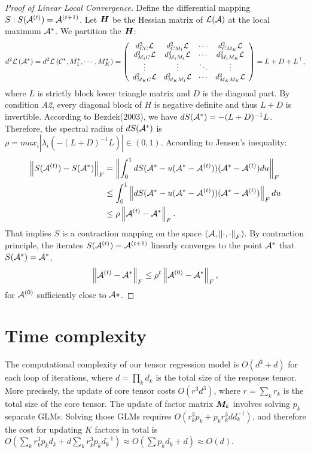 \documentclass[11pt]{article}
\theoremstyle{plain}
\theoremstyle{definition}
\begin{document}
\begin{proof}[Proof of Linear Local Convergence]
Define the differential mapping $S: S(\mathcal{A}^{(t)}) = \mathcal{A}^{(t + 1)}$. Let $\bm{H}$ be the Hessian matrix of $\mathcal{L}(\mathcal{A})$ at the local maximum $\mathcal{A}^*$. We partition the $\bm{H}$:
\begin{align*}
    d^{2} \mathcal{L}\left(\mathcal{A}^* \right) =  d^{2} \mathcal{L}\left(\mathcal{C}^*, M_1^*,\cdots,M_K^* \right) =\left(\begin{array}{cccc}d_{CC}^{2} \mathcal{L} &d_{CM_1}^{2} \mathcal{L}  & \cdots & d_{CM_K}^{2} \mathcal{L} \\ d_{M_1C}^{2} \mathcal{L}  &d_{M_1 M_1}^{2} \mathcal{L} & \cdots &  d_{M_1 M_K}^{2} \mathcal{L}\\ \vdots & \vdots & \ddots & \vdots \\d_{M_KC}^{2} \mathcal{L}& d_{M_K M_1}^{2} \mathcal{L} & \cdots & d_{M_K M_K}^{2} \mathcal{L} \end{array}\right)=L+D+L^{\top},
\end{align*}
where $L$ is strictly block lower triangle matrix and $D$ is the diagonal part. By condition \textit{A2}, every diagonal block of $H$ is negative definite and thus $L+ D$ is invertible.  According to Bezdek(2003), we have $d S(\mathcal{A}^*) = -(L+D)^{-1} L$.  Therefore, the spectral radius of $dS(\mathcal{A}^*)$ is $\rho =  max_i |\lambda_i(-(L+D)^{-1} L)| \in (0,1)$. According to Jensen's inequality:
\begin{align*}
    \left\lVert S(\mathcal{A}^{(t)})- S(\mathcal{A}^*)\right\rVert_F &= \left\lVert \int_{0}^1 dS( \mathcal{A}^{*} - u (\mathcal{A}^* - \mathcal{A}^{(t)})) (\mathcal{A}^* - \mathcal{A}^{(t)}) du\right\rVert_F \\
    &\leq \int_{0}^1 \left\lVert dS( \mathcal{A}^{*} - u (\mathcal{A}^* - \mathcal{A}^{(t)})) (\mathcal{A}^* - \mathcal{A}^{(t)})\right\rVert_F du\\
    &\leq \rho \left\lVert\mathcal{A}^{(t)} -\mathcal{A}^{*} \right\rVert_F.
\end{align*}
That implies $S$ is a contraction mapping on the space $(\mathcal{A}, \left\lVert\cdot,\cdot\right\rVert_F)$. By contraction principle, the iterates $S(\mathcal{A}^{(t)}) = \mathcal{A}^{(t+1)}$ linearly converges to the point $\mathcal{A}^*$ that $S(\mathcal{A}^*) = \mathcal{A}^*$,
\begin{align*}
    \left\lVert\mathcal{A}^{(t)}- \mathcal{A}^*\right\rVert_F \leq \rho^t \left\lVert\mathcal{A}^{(0)}- \mathcal{A}^*\right\rVert_F,
\end{align*}
for $\mathcal{A}^{(0)}$ sufficiently close to $\mathcal{A}*$.

\end{proof}

\section{Time complexity}
The computational complexity of our tensor regression model is $O(d^3+d)$ for each loop of iterations, where $d=\prod_k d_k$ is the total size of the response tensor. More precisely, the update of core tensor costs $O(r^3d^3)$, where $r=\sum_k r_k$ is the total size of the core tensor. The update of factor matrix $\bm M_k$ involves solving $p_k$ separate GLMs. Solving those GLMs requires $O(r_k^3 p_k + p_kr_k^3 dd^{-1}_k)$, and therefore the cost for updating $K$ factors in total is $O( \sum_k r^3_k p_k d_k + d\sum_k r_k^3 p_k d_k^{-1})\approx O(\sum p_k d_k +d)\approx O(d)$. 
\end{document}
